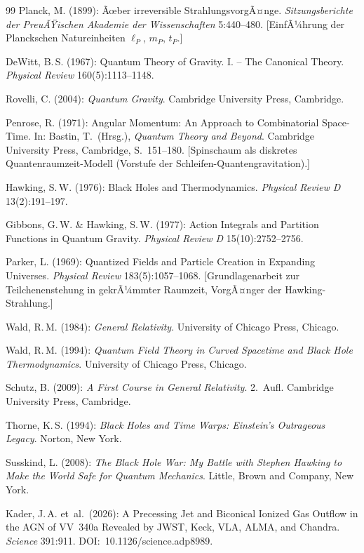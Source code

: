 ﻿\documentclass[12pt,a4paper]{report}
\begin{document}
\begin{thebibliography}{99}
Planck, M. (1899): Ãœber irreversible StrahlungsvorgÃ¤nge. \textit{Sitzungsberichte der PreuÃŸischen Akademie der Wissenschaften} 5:440--480. [EinfÃ¼hrung der Planckschen Natureinheiten $\ell_P$, $m_P$, $t_P$.]

DeWitt, B.\,S. (1967): Quantum Theory of Gravity. I. -- The Canonical Theory. \textit{Physical Review} 160(5):1113--1148.

Rovelli, C. (2004): \textit{Quantum Gravity}. Cambridge University Press, Cambridge.

Penrose, R. (1971): Angular Momentum: An Approach to Combinatorial Space-Time. In: Bastin, T.\ (Hrsg.), \textit{Quantum Theory and Beyond}. Cambridge University Press, Cambridge, S.\ 151--180. [Spinschaum als diskretes Quantenraumzeit-Modell (Vorstufe der Schleifen-Quantengravitation).]

Hawking, S.\,W. (1976): Black Holes and Thermodynamics. \textit{Physical Review D} 13(2):191--197.

Gibbons, G.\,W. \& Hawking, S.\,W. (1977): Action Integrals and Partition Functions in Quantum Gravity. \textit{Physical Review D} 15(10):2752--2756.

Parker, L. (1969): Quantized Fields and Particle Creation in Expanding Universes. \textit{Physical Review} 183(5):1057--1068. [Grundlagenarbeit zur Teilchenenstehung in gekrÃ¼mmter Raumzeit, VorgÃ¤nger der Hawking-Strahlung.]

Wald, R.\,M. (1984): \textit{General Relativity}. University of Chicago Press, Chicago.

Wald, R.\,M. (1994): \textit{Quantum Field Theory in Curved Spacetime and Black Hole Thermodynamics}. University of Chicago Press, Chicago.

Schutz, B. (2009): \textit{A First Course in General Relativity}. 2.\ Aufl. Cambridge University Press, Cambridge.

Thorne, K.\,S. (1994): \textit{Black Holes and Time Warps: Einstein's Outrageous Legacy}. Norton, New York.

Susskind, L. (2008): \textit{The Black Hole War: My Battle with Stephen Hawking to Make the World Safe for Quantum Mechanics}. Little, Brown and Company, New York.


Kader, J.\,A. et~al.\ (2026): A Precessing Jet and Biconical Ionized Gas Outflow in the AGN of VV~340a Revealed by JWST, Keck, VLA, ALMA, and Chandra. \textit{Science} 391:911. DOI:~10.1126/science.adp8989.

\end{thebibliography}
	
\end{document}
